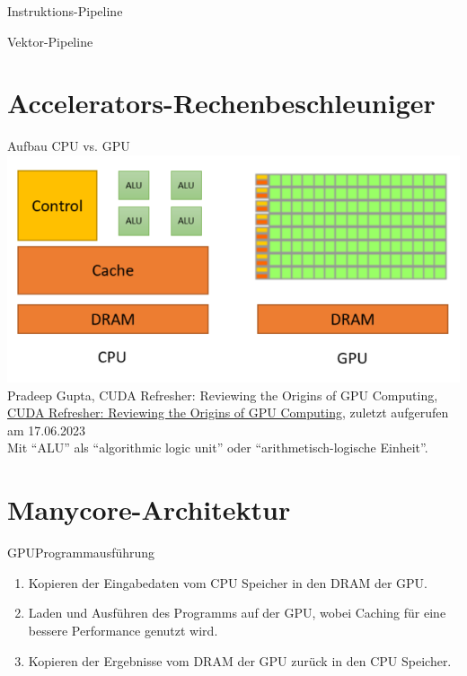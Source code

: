 \begin{defi}{Instruktions-Pipeline}

\end{defi}

\begin{defi}{Vektor-Pipeline}

\end{defi}

\section{Accelerators-Rechenbeschleuniger}

\begin{defi}{Aufbau CPU vs. GPU}
    \includegraphics[width=\textwidth]{includes/graphics/CPUvsGPU.png}
    Pradeep Gupta, CUDA Refresher: Reviewing the Origins of GPU Computing,
    \url{CUDA Refresher: Reviewing the Origins of GPU Computing},
    zuletzt aufgerufen am 17.06.2023 \\
    Mit \enquote{ALU} als \enquote{algorithmic logic unit} oder \enquote{arithmetisch-logische Einheit}.
\end{defi}

\section{Manycore-Architektur}

\begin{defi}{GPU}{Programmausführung}
    \begin{enumerate}
        \item Kopieren der Eingabedaten vom CPU Speicher in den DRAM der GPU.
        \item Laden und Ausführen des Programms auf der GPU, wobei Caching für eine bessere Performance genutzt wird.
        \item Kopieren der Ergebnisse vom DRAM der GPU zurück in den CPU Speicher.
    \end{enumerate}
\end{defi}

